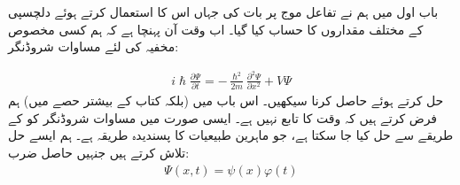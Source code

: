 

باب اول میں ہم نے تفاعل موج پر بات کی جہاں اس کا استعمال کرتے ہوئے دلچسپی کے مختلف مقداروں کا حساب کیا گیا۔ اب وقت آن پہنچا ہے کہ ہم کسی مخصوص مخفیہ  کی لئے مساوات شروڈنگر:

\begin{align}\label{مساوات_شروڈنگر_تابع_وقت}
i \hslash \frac{\partial \Psi}{\partial t} = - \frac{\hslash^{2}}{2 m} \frac{\partial^{2} \Psi}{\partial x^{2}} + V\Psi
\end{align}
 حل کرتے ہوئے  حاصل کرنا سیکھیں۔ اس باب میں (بلکہ کتاب کے بیشتر حصے میں) ہم فرض کرتے ہیں کہ  وقت  کا تابع نہیں ہے۔ ایسی صورت میں  مساوات شروڈنگر  کو  کے طریقے سے حل کیا جا سکتا ہے، جو ماہرین طبیعیات کا پسندیدہ طریقہ ہے۔ ہم ایسے حل تلاش کرتے ہیں جنہیں حاصل ضرب:
\begin{align}
\Psi (x,t) = \psi (x) \varphi (t)
\end{align}

